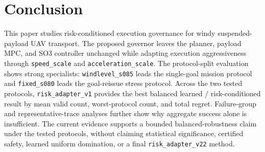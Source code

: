 \section{Conclusion}

This paper studies risk-conditioned execution governance for windy
suspended-payload UAV transport. The proposed governor leaves the planner,
payload MPC, and SO3 controller unchanged while adapting execution
aggressiveness through \texttt{speed\_scale} and
\texttt{acceleration\_scale}. The protocol-split evaluation shows strong
specialists: \texttt{windlevel\_s085} leads the single-goal mission protocol
and \texttt{fixed\_s080} leads the goal-reissue stress protocol. Across the
two tested protocols, \texttt{risk\_adapter\_v1} provides the best balanced
learned / risk-conditioned result by mean valid count, worst-protocol count,
and total regret. Failure-group and representative-trace analyses further show
why aggregate success alone is insufficient. The current evidence supports a
bounded balanced-robustness claim under the tested protocols, without claiming
statistical significance, certified safety, learned uniform domination, or a
final \texttt{risk\_adapter\_v22} method.
